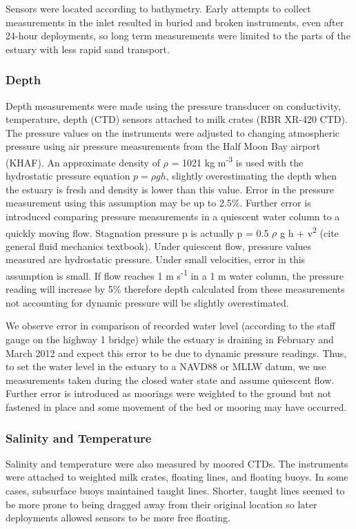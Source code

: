 Sensors were located according to bathymetry. Early attempts to collect measurements in the inlet resulted in buried and broken instruments, even after 24-hour deployments, so long term measurements were limited to the parts of the estuary with less rapid sand transport. 

\subsubsection{Depth} \label{sssec:depth}
Depth measurements were made using the pressure transducer on conductivity, temperature, depth (CTD) sensors
attached to milk crates (RBR XR-420 CTD). The pressure values on the instruments were adjusted to
changing atmospheric pressure using air pressure measurements from the
Half Moon Bay airport (KHAF). An approximate density of $\rho$ = 1021 kg
m\textsuperscript{-3} is used with the hydrostatic pressure equation ${p
= \rho g h}$, slightly overestimating the depth when the estuary is
fresh and density is lower than this value. Error in the pressure
measurement using this assumption may be up to 2.5\%. Further error is
introduced comparing pressure measurements in a quiescent water column
to a quickly moving flow. Stagnation pressure p is actually p = 0.5
$\rho$ g h +  v\textsuperscript{2} (cite general fluid mechanics
textbook). Under quiescent flow, pressure values measured are
hydrostatic pressure. Under small velocities, error in this assumption
is small. If flow reaches 1 m s\textsuperscript{-1} in a 1 m water
column, the pressure reading will increase by 5\% therefore depth
calculated from these measurements not accounting for dynamic pressure
will be slightly overestimated.

We observe error in comparison of recorded water level (according to the
staff gauge on the highway 1 bridge) while the estuary is draining in
February and March 2012 and expect this error to be due to dynamic
pressure readings. Thus, to set the water level in the estuary to a
NAVD88 or MLLW datum, we use measurements taken during the closed water
state and assume quiescent flow.  Further error is introduced as
moorings were weighted to the ground but not fastened in place and some
movement of the bed or mooring may have occurred.

\subsubsection{Salinity and Temperature} \label{sssec:SandT}
Salinity and temperature were also measured by moored CTDs. The instruments were attached to weighted milk crates, floating lines, and floating buoys. In some cases, subsurface buoys maintained taught lines.  Shorter, taught lines seemed to be more prone to being dragged away from their original location so later deployments allowed sensors to be more free floating. 

